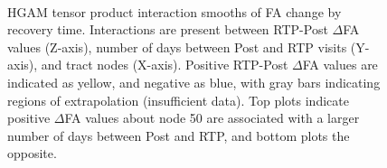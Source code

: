 \documentclass[12pt]{article}
\begin{document}
\begin{figure}[H]
	\\
	\captionsetup{} %
	\caption{HGAM tensor product interaction smooths of FA change by recovery time. Interactions are present between RTP-Post $\Delta$FA values (Z-axis), number of days between Post and RTP visits (Y-axis), and tract nodes (X-axis). Positive RTP-Post $\Delta$FA values are indicated as yellow, and negative as blue, with gray bars indicating regions of extrapolation (insufficient data). Top plots indicate positive $\Delta$FA values about node 50 are associated with a larger number of days between Post and RTP, and bottom plots the opposite.}
	\label{fig:di-time}
\end{figure}
\end{document}
